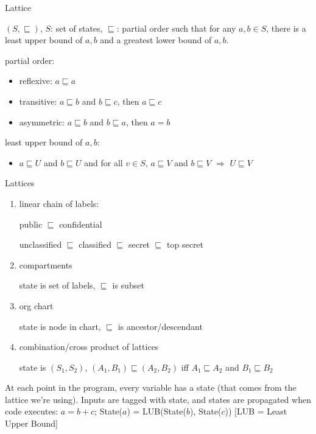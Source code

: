 \begin{definition}{Lattice}

    $(S, \sqsubseteq)$, $S$: set of states, $\sqsubseteq$: partial order such
    that for any $a, b \in S$, there is a least upper bound of $a, b$ and a
    greatest lower bound of $a,b$.

    partial order:
    \begin{itemize}
        \item reflexive: $a \sqsubseteq a$
        \item transitive: $a \sqsubseteq b$ and $b \sqsubseteq c$, then
            $a \sqsubseteq c$
        \item asymmetric: $a \sqsubseteq b$ and $b \sqsubseteq a$, then $a = b$
    \end{itemize}
    least upper bound of $a, b$:
    \begin{itemize}
        \item $a \sqsubseteq U$ and $b \sqsubseteq U$ and for all $v \in S$,
            $a \sqsubseteq V$ and $b \sqsubseteq V$ $\Rightarrow$
            $U \sqsubseteq V$
    \end{itemize}
\end{definition}
\begin{example}{Lattices}
    \begin{enumerate}
        \item linear chain of labels:

            public $\sqsubseteq$ confidential

            unclassified $\sqsubseteq$ classified $\sqsubseteq$ secret
                $\sqsubseteq$ top secret
        \item compartments

            state is set of labels, $\sqsubseteq$ is subset
        \item org chart

            state is node in chart, $\sqsubseteq$ is ancestor/descendant
        \item combination/cross product of lattices

            state is $(S_1, S_2)$, $(A_1, B_1) \sqsubseteq (A_2, B_2)$ iff
            $A_1 \sqsubseteq A_2$ and $B_1 \sqsubseteq B_2$
    \end{enumerate}
\end{example}
At each point in the program, every variable has a state (that comes from the
lattice we're using). Inputs are tagged with state, and states are propagated
when code executes: $a = b + c$; State($a$) = LUB(State($b$), State($c$))
[LUB = Least Upper Bound]

